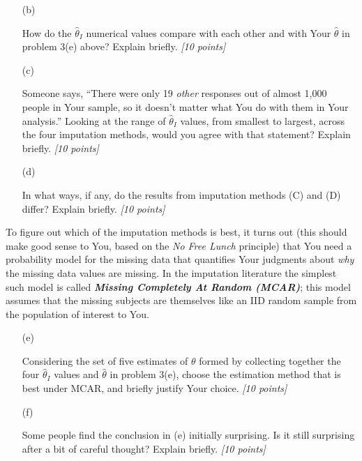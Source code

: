 \documentclass[12pt]{article}
\begin{document}
\begin{itemize}
\begin{itemize}
\item[(b)]

How do the $\hat{ \theta }_I$ numerical values compare with each other and with Your $\hat{ \theta }$ in problem 3(e) above? Explain briefly. \textit{[10 points]}

\vspace*{1.0in}

\item[(c)]

Someone says, ``There were only 19 \textit{other} responses out of almost 1,000 people in Your sample, so it doesn't matter what You do with them in Your analysis.'' Looking at the range of $\hat{ \theta }_I$ values, from smallest to largest, across the four imputation methods, would you agree with that statement? Explain briefly. \textit{[10 points]}

\vspace*{1.0in}

\item[(d)]

In what ways, if any, do the results from imputation methods (C) and (D) differ? Explain briefly. \textit{[10 points]}

\vspace*{1.0in}

\end{itemize}

To figure out which of the imputation methods is best, it turns out (this should make good sense to You, based on the \textit{No Free Lunch} principle) that You need a probability model for the missing data that quantifies Your judgments about \textit{why} the missing data values are missing. In the imputation literature the simplest such model is called \textbf{\textit{Missing Completely At Random (MCAR)}}; this model assumes that the missing subjects are themselves like an IID random sample from the population of interest to You.

\begin{itemize}

\item[(e)]

Considering the set of five estimates of $\theta$ formed by collecting together the four 
$\hat{ \theta }_I$ values and $\hat{ \theta }$ in problem 3(e), choose the estimation method that is best under MCAR, and briefly justify Your choice. \textit{[10 points]}

\end{itemize}

\newpage

\begin{itemize}

\item[(f)]

Some people find the conclusion in (e) initially surprising. Is it still surprising after a bit of careful thought? Explain briefly. \textit{[10 points]}

\vspace*{1.0in}

\end{itemize}

\end{itemize}
\end{document}

